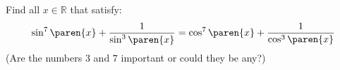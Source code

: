 Find all $x \in \mathbb{R}$ that satisfy:
\begin{equation*}
  \sin^7\paren{x} + \frac{1}{\sin^3\paren{x}} =
  \cos^7\paren{x} + \frac{1}{\cos^3\paren{x}}
\end{equation*}
(Are the numbers $3$ and $7$ important or could they be any?)
